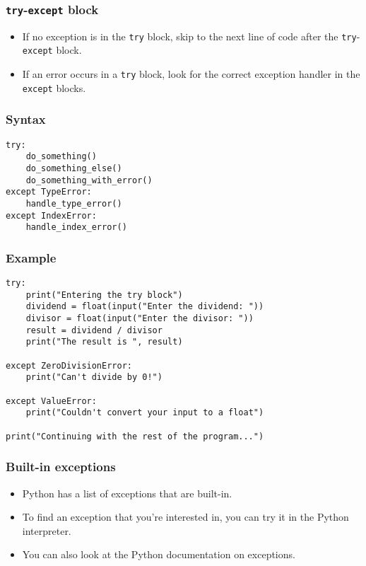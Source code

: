 \documentclass[11pt]{article}
\begin{document}
\subsubsection{\texttt{try}-\texttt{except} block}
\label{sec:org49a34ae}
\begin{itemize}
\item If no exception is in the \texttt{try} block, skip to the next line of code after the \texttt{try}-\texttt{except} block.
\item If an error occurs in a \texttt{try} block, look for the correct exception handler in the \texttt{except} blocks.
\end{itemize}

\subsubsection{Syntax}
\label{sec:orgff4ebd7}
\begin{verbatim}
try:
    do_something()
    do_something_else()
    do_something_with_error()
except TypeError:
    handle_type_error()
except IndexError:
    handle_index_error()
\end{verbatim}

\subsubsection{Example}
\label{sec:org9ecb7d8}
\begin{verbatim}
try:
    print("Entering the try block")
    dividend = float(input("Enter the dividend: "))
    divisor = float(input("Enter the divisor: "))
    result = dividend / divisor
    print("The result is ", result)

except ZeroDivisionError:
    print("Can't divide by 0!")

except ValueError:
    print("Couldn't convert your input to a float")

print("Continuing with the rest of the program...")
\end{verbatim}

\subsubsection{Built-in exceptions}
\label{sec:orgcd50195}
\begin{itemize}
\item Python has a list of exceptions that are built-in.
\item To find an exception that you're interested in, you can try it in the Python interpreter.
\item You can also look at the Python documentation on exceptions.
\end{itemize}
\end{document}
